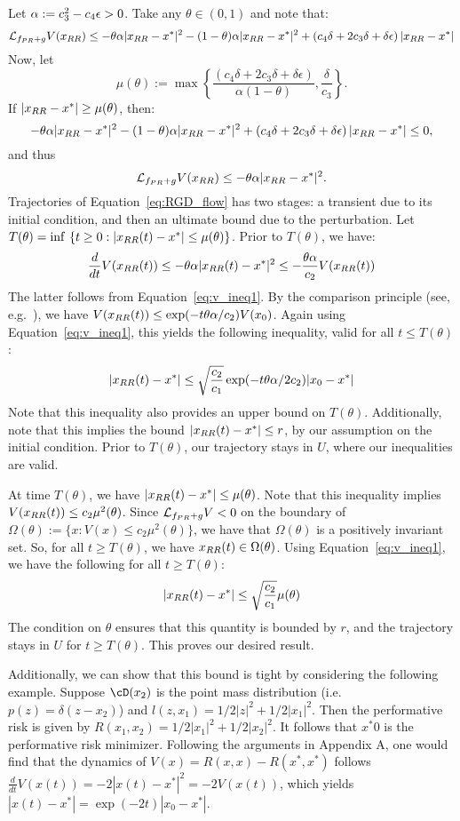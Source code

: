 Let $\alpha := c_3^2 - c_4 \epsilon > 0$. Take any $\theta \in (0,1)$ and note that:
\[
\mathcal{L}_{f_{PR} + g}V(x_{RR}) \le - \theta \alpha | x_{RR} - x^* |^2 - (1 - \theta) \alpha | x_{RR} - x^* |^2 +\left(c_4\delta + 2c_3\delta+\delta\epsilon\right)|x_{RR}-x^*|
\]
Now, let 
\[
    \mu(\theta)
    :=
    \max
    \left\{
    \frac
    {
        \left(c_4\delta + 2c_3\delta+\delta\epsilon\right)
    }
    {\alpha(1 - \theta)},
    \frac{\delta}{c_3}
    \right\}.
\]
If $|x_{RR} - x^*| \ge \mu(\theta)$, then:
\[
- \theta \alpha | x_{RR} - x^* |^2 - (1 - \theta) \alpha | x_{RR} - x^* |^2 +\left(c_4\delta + 2c_3\delta+\delta\epsilon\right)|x_{RR}-x^*| \le 0,
\]
and thus
\[
\mathcal{L}_{f_{PR} + g}V(x_{RR}) \le - \theta \alpha | x_{RR} - x^* |^2.
\]
Trajectories of Equation~\eqref{eq:RGD_flow} has two stages: a transient due to its initial condition, and then an ultimate bound due to the perturbation. Let $T(\theta) = \inf~\{ t \ge 0 : |x_{RR}(t) - x^*| \le \mu(\theta) \}$. Prior to $T(\theta)$, we have:
\[
\frac{d}{dt} V(x_{RR}(t)) \le - \theta \alpha |x_{RR}(t) - x^*|^2 \le - \frac{\theta \alpha}{c_2} V(x_{RR}(t))
\]
The latter follows from Equation~\eqref{eq:v_ineq1}. 
By the comparison principle (see, e.g.~\citep[Lemma 3.4]{Khalil:2001wj}), we have $V(x_{RR}(t)) \le \exp(-t\theta \alpha / c_2) V(x_0)$. Again using Equation~\eqref{eq:v_ineq1}, this yields the following inequality, valid for all $t \le T(\theta)$:
\[
|x_{RR}(t) - x^*| \le \sqrt{\frac{c_2}{c_1}} \exp(-t\theta \alpha/2c_2) |x_0 - x^*|
\]
Note that this inequality also provides an upper bound on $T(\theta)$. Additionally, note that this implies the bound $|x_{RR}(t) - x^*| \le r$, by our assumption on the initial condition. Prior to $T(\theta)$, our trajectory stays in $U$, where our inequalities are valid.

At time $T(\theta)$, we have $|x_{RR}(t) - x^*| \le \mu(\theta)$. Note that this inequality implies $V(x_{RR}(t)) \le c_2 \mu^2(\theta)$. Since $\mathcal{L}_{f_{PR} + g}V < 0$ on the boundary of $\Omega(\theta) := \{ x : V(x) \le c_2 \mu^2(\theta) \}$, we have that $\Omega(\theta)$ is a positively invariant set. So, for all $t \ge T(\theta)$, we have $x_{RR}(t) \in \Omega(\theta)$. Using Equation~\eqref{eq:v_ineq1}, we have the following for all $t \ge T(\theta)$:
\[
|x_{RR}(t) - x^*| \le 
\sqrt{\frac{c_2}{c_1}} \mu(\theta) 
\]
The condition on $\theta$ ensures that this quantity is bounded by $r$, and the trajectory stays in $U$ for $t \ge T(\theta)$. 
This proves our desired result.

Additionally, we can show that this bound is tight by considering the following example. 
Suppose $\cD(x_2)$ is the point mass distribution (i.e. $p(z) = \delta(z - x_2)$) and $l(z, x_1) = 1/2 |z|^2 + 1/2|x_1|^2$. Then the performative risk is given by $R(x_1, x_2) = 1/2 |x_1|^2 + 1/2|x_2|^2$. It follows that $x^* 0$ is the performative risk minimizer. Following the arguments in Appendix A, one would find that the dynamics of $V(x) = R(x, x) - R(x^*, x^*)$ follows $\frac{d}{dt} V(x(t)) = -2 |x(t) - x^*|^2 = -2 V(x(t))$, which yields 
    $|x(t) - x^*| = \exp(-2t)|x_0 - x^*|$.
